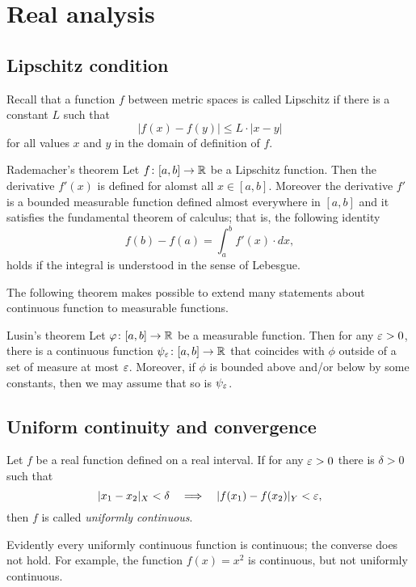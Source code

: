 \chapter{Real analysis}

\section{Lipschitz condition}

Recall that a function $f$ between metric spaces is called Lipschitz if there is a constant $L$ such that 
\[|f(x)-f(y)|\le L\cdot|x-y|\]
for all values $x$ and $y$ in the domain of definition of $f$.

\begin{thm}{Rademacher's theorem}\label{thm:rademacher}
Let $f\colon[a,b]\to\mathbb{R}$ be a Lipschitz function.
Then the derivative $f'(x)$ is defined for alomst all $x\in [a,b]$.
Moreover the derivative $f'$ is a bounded measurable function defined almost everywhere in $[a,b]$ and it satisfies the fundamental theorem of calculus; that is, the following identity 
\[f(b)-f(a)=\int_a^b f'(x)\cdot dx,\]
holds if the integral is understood in the sense of Lebesgue.
\end{thm}

The following theorem makes possible to extend many statements about continuous function to measurable functions.

\begin{thm}{Lusin's theorem}\label{thm:lusin}
Let $\varphi\colon[a,b]\to \mathbb{R}$ be a measurable function.
Then for any $\varepsilon>0$, there is a continuous function $\psi_\varepsilon\colon[a,b]\to \mathbb{R}$ that coincides with $\phi$ outside of a set of measure at most $\varepsilon$.
Moreover, if $\phi$ is bounded above and/or below by some constants, then we may assume that so is $\psi_\varepsilon$.  
\end{thm}

\section{Uniform continuity and convergence}

Let $f$ be a real function defined on a real interval.
If  for any $\varepsilon>0$ there is $\delta>0$ such that 
\[|x_1-x_2|_X<\delta\quad\Longrightarrow\quad |f(x_1)-f(x_2)|_Y<\varepsilon,\]
then $f$ is called \emph{uniformly continuous}.

Evidently every uniformly continuous function is continuous;
the converse does not hold.
For example, the function $f(x)=x^2$ is continuous, but not uniformly continuous.

